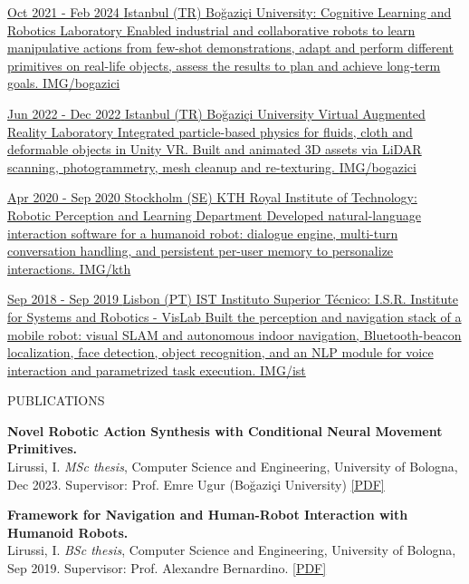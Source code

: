 \documentclass[paper=a4,fontsize=11pt, hidelinks]{temp} %
\makeatletter
\renewcommand{\NewPart}[1]{%
  \par\addvspace{3.5ex \@plus 1ex \@minus .2ex}%
  {\noindent\usefont{OT1}{phv}{b}{n}\Large\color{headings}%
   \MakeUppercase{#1}\hfill\makebox[0pt][r]{\rule[-5pt]{\hsize}{3pt}}\par}%
  \nobreak\vspace{2.3ex \@plus .2ex}\@afterheading}
\makeatother
\begin{document}
\href{https://colors.cmpe.boun.edu.tr}{
{Oct 2021 - Feb 2024}
{Istanbul (TR) Boğaziçi University: Cognitive Learning and Robotics Laboratory}
{
Enabled industrial and collaborative robots to learn manipulative actions from few-shot demonstrations, adapt and perform different primitives on real-life objects, assess the results to plan and achieve long-term goals.
} {IMG/bogazici}
}
\sepspace


\href{https://buviar.bogazici.edu.tr}{
{Jun 2022 - Dec 2022}
{Istanbul (TR) Boğaziçi University Virtual Augmented Reality Laboratory}
{
Integrated particle-based physics for fluids, cloth and deformable objects in Unity VR. Built and animated 3D assets via LiDAR scanning, photogrammetry, mesh cleanup and re-texturing.
} {IMG/bogazici}
}
\sepspace


\href{https://www.kth.se/is/rpl}{
{Apr 2020 - Sep 2020}
{Stockholm (SE) KTH Royal Institute of Technology: Robotic Perception and Learning Department}
{
Developed natural-language interaction software for a humanoid robot: dialogue engine, multi-turn conversation handling, and persistent per-user memory to personalize interactions.
} {IMG/kth}
}
\sepspace


\href{https://welcome.isr.tecnico.ulisboa.pt/}{
{Sep 2018 - Sep 2019}
{Lisbon (PT) IST Instituto Superior Técnico: I.S.R. Institute for Systems and Robotics - VisLab}
{
Built the perception and navigation stack of a mobile robot: visual SLAM and autonomous indoor navigation, Bluetooth-beacon localization, face detection, object recognition, and an NLP module for voice interaction and parametrized task execution.
} {IMG/ist}
}

\NewPart{Publications}{}
\noindent

\noindent \textbf{Novel Robotic Action Synthesis with Conditional Neural Movement Primitives.}\\
Lirussi, I. \textit{MSc thesis}, Computer Science and Engineering, University of Bologna, Dec 2023.
 Supervisor: Prof. Emre Ugur (Boğaziçi University)
 \href{https://amslaurea.unibo.it/id/eprint/30641/}{[PDF]}
\sepspace

\noindent \textbf{Framework for Navigation and Human-Robot Interaction with Humanoid Robots.}\\
Lirussi, I. \textit{BSc thesis}, Computer Science and Engineering, University of Bologna, Sep 2019.
Supervisor: Prof. Alexandre Bernardino.
\href{https://amslaurea.unibo.it/id/eprint/19120/}{[PDF]}
\sepspace
\end{document}
